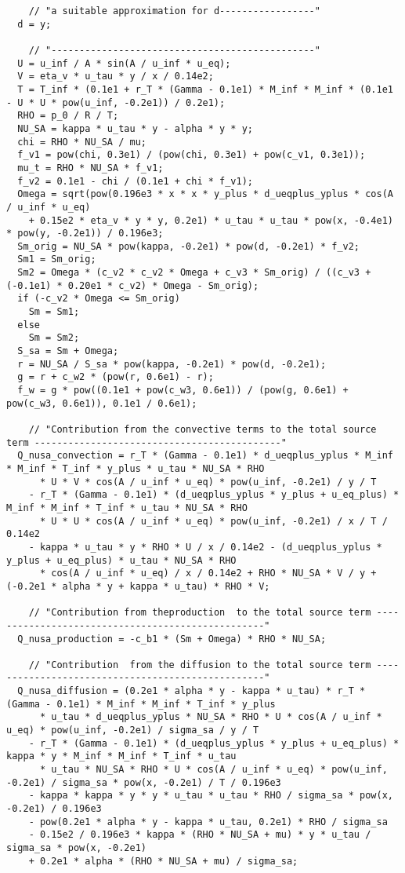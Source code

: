 \documentclass[10pt]{article}
\begin{document}
\begin{footnotesize}
\begin{verbatim}
    // "a suitable approximation for d-----------------"
  d = y;

    // "-----------------------------------------------"
  U = u_inf / A * sin(A / u_inf * u_eq);
  V = eta_v * u_tau * y / x / 0.14e2;
  T = T_inf * (0.1e1 + r_T * (Gamma - 0.1e1) * M_inf * M_inf * (0.1e1 - U * U * pow(u_inf, -0.2e1)) / 0.2e1);
  RHO = p_0 / R / T;
  NU_SA = kappa * u_tau * y - alpha * y * y;
  chi = RHO * NU_SA / mu;
  f_v1 = pow(chi, 0.3e1) / (pow(chi, 0.3e1) + pow(c_v1, 0.3e1));
  mu_t = RHO * NU_SA * f_v1;
  f_v2 = 0.1e1 - chi / (0.1e1 + chi * f_v1);
  Omega = sqrt(pow(0.196e3 * x * x * y_plus * d_ueqplus_yplus * cos(A / u_inf * u_eq) 
    + 0.15e2 * eta_v * y * y, 0.2e1) * u_tau * u_tau * pow(x, -0.4e1) * pow(y, -0.2e1)) / 0.196e3;
  Sm_orig = NU_SA * pow(kappa, -0.2e1) * pow(d, -0.2e1) * f_v2;
  Sm1 = Sm_orig;
  Sm2 = Omega * (c_v2 * c_v2 * Omega + c_v3 * Sm_orig) / ((c_v3 + (-0.1e1) * 0.20e1 * c_v2) * Omega - Sm_orig);
  if (-c_v2 * Omega <= Sm_orig)
    Sm = Sm1;
  else
    Sm = Sm2;
  S_sa = Sm + Omega;
  r = NU_SA / S_sa * pow(kappa, -0.2e1) * pow(d, -0.2e1);
  g = r + c_w2 * (pow(r, 0.6e1) - r);
  f_w = g * pow((0.1e1 + pow(c_w3, 0.6e1)) / (pow(g, 0.6e1) + pow(c_w3, 0.6e1)), 0.1e1 / 0.6e1);

    // "Contribution from the convective terms to the total source term --------------------------------------------"
  Q_nusa_convection = r_T * (Gamma - 0.1e1) * d_ueqplus_yplus * M_inf * M_inf * T_inf * y_plus * u_tau * NU_SA * RHO 
      * U * V * cos(A / u_inf * u_eq) * pow(u_inf, -0.2e1) / y / T 
    - r_T * (Gamma - 0.1e1) * (d_ueqplus_yplus * y_plus + u_eq_plus) * M_inf * M_inf * T_inf * u_tau * NU_SA * RHO 
      * U * U * cos(A / u_inf * u_eq) * pow(u_inf, -0.2e1) / x / T / 0.14e2 
    - kappa * u_tau * y * RHO * U / x / 0.14e2 - (d_ueqplus_yplus * y_plus + u_eq_plus) * u_tau * NU_SA * RHO 
      * cos(A / u_inf * u_eq) / x / 0.14e2 + RHO * NU_SA * V / y + (-0.2e1 * alpha * y + kappa * u_tau) * RHO * V;

    // "Contribution from theproduction  to the total source term --------------------------------------------------"
  Q_nusa_production = -c_b1 * (Sm + Omega) * RHO * NU_SA;

    // "Contribution  from the diffusion to the total source term --------------------------------------------------"
  Q_nusa_diffusion = (0.2e1 * alpha * y - kappa * u_tau) * r_T * (Gamma - 0.1e1) * M_inf * M_inf * T_inf * y_plus 
      * u_tau * d_ueqplus_yplus * NU_SA * RHO * U * cos(A / u_inf * u_eq) * pow(u_inf, -0.2e1) / sigma_sa / y / T 
    - r_T * (Gamma - 0.1e1) * (d_ueqplus_yplus * y_plus + u_eq_plus) * kappa * y * M_inf * M_inf * T_inf * u_tau 
      * u_tau * NU_SA * RHO * U * cos(A / u_inf * u_eq) * pow(u_inf, -0.2e1) / sigma_sa * pow(x, -0.2e1) / T / 0.196e3 
    - kappa * kappa * y * y * u_tau * u_tau * RHO / sigma_sa * pow(x, -0.2e1) / 0.196e3 
    - pow(0.2e1 * alpha * y - kappa * u_tau, 0.2e1) * RHO / sigma_sa 
    - 0.15e2 / 0.196e3 * kappa * (RHO * NU_SA + mu) * y * u_tau / sigma_sa * pow(x, -0.2e1) 
    + 0.2e1 * alpha * (RHO * NU_SA + mu) / sigma_sa;


\end{verbatim}
\end{footnotesize}
\end{document}
